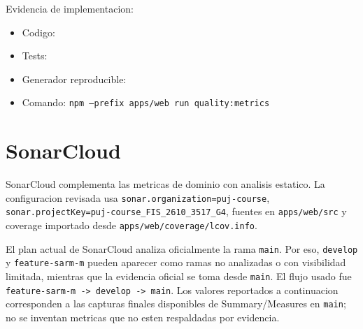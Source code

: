 \documentclass[11pt,a4paper]{article}
\begin{document}
Evidencia de implementacion:

\begin{itemize}[leftmargin=*]
\item Codigo: 
\item Tests: 
\item Generador reproducible: 
\item Comando: \texttt{npm --prefix apps/web run quality:metrics}
\end{itemize}

\section{SonarCloud}

SonarCloud complementa las metricas de dominio con analisis estatico. La configuracion revisada usa \texttt{sonar.organization=puj-course}, \texttt{sonar.projectKey=puj-course\_FIS\_2610\_3517\_G4}, fuentes en \texttt{apps/web/src} y coverage importado desde \texttt{apps/web/coverage/lcov.info}.

El plan actual de SonarCloud analiza oficialmente la rama \texttt{main}. Por eso, \texttt{develop} y \texttt{feature-sarm-m} pueden aparecer como ramas no analizadas o con visibilidad limitada, mientras que la evidencia oficial se toma desde \texttt{main}. El flujo usado fue \texttt{feature-sarm-m -> develop -> main}. Los valores reportados a continuacion corresponden a las capturas finales disponibles de Summary/Measures en \texttt{main}; no se inventan metricas que no esten respaldadas por evidencia.
\end{document}
